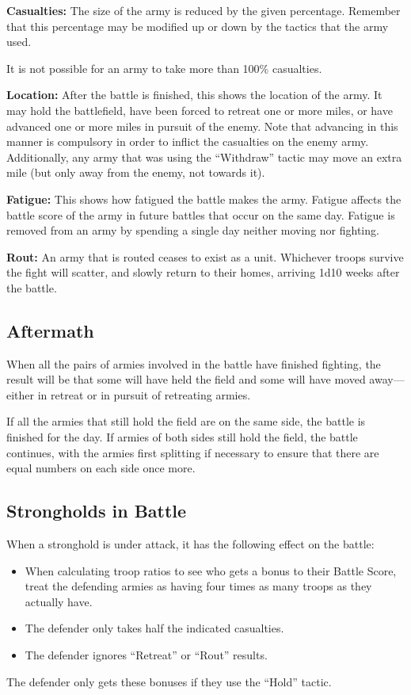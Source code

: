 \begin{multicols*}{2}

\textbf{Casualties:} The size of the army is reduced by the given percentage. Remember that this percentage may be modified up or down by the tactics that the army used.

It is not possible for an army to take more than 100\% casualties.

\textbf{Location:} After the battle is finished, this shows the location of the army. It may hold the battlefield, have been forced to retreat one or more miles, or have advanced one or more miles in pursuit of the enemy. Note that advancing in this manner is compulsory in order to inflict the casualties on the enemy army. Additionally, any army that was using the “Withdraw” tactic may move an extra mile (but only away from the enemy, not towards it).

\textbf{Fatigue:} This shows how fatigued the battle makes the army. Fatigue affects the battle score of the army in future battles that occur on the same day. Fatigue is removed from an army by spending a single day neither moving nor fighting.

\textbf{Rout:} An army that is routed ceases to exist as a unit. Whichever troops survive the fight will scatter, and slowly return to their homes, arriving 1d10 weeks after the battle.

\subsection{Aftermath}
When all the pairs of armies involved in the battle have finished fighting, the result will be that some will have held the field and some will have moved away—either in retreat or in pursuit of retreating armies.

If all the armies that still hold the field are on the same side, the battle is finished for the day. If armies of both sides still hold the field, the battle continues, with the armies first splitting if necessary to ensure that there are equal numbers on each side once more.

\subsection{Strongholds in Battle}
When a stronghold is under attack, it has the following effect on the battle:

\begin{itemize}
	\item{When calculating troop ratios to see who gets a bonus to their Battle Score, treat the defending armies as having four times as many troops as they actually have.}
	\item{The defender only takes half the indicated casualties.}
	\item{The defender ignores “Retreat” or “Rout” results.}
\end{itemize}
The defender only gets these bonuses if they use the “Hold” tactic.


\end{multicols*}
